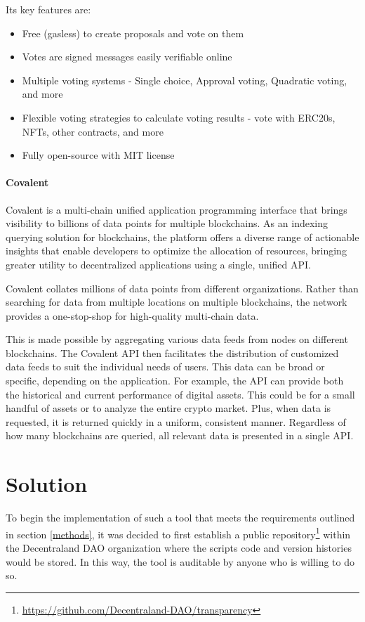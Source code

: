 \documentclass[MSE,Master,english]{twbook}%
\begin{document}
Its key features are:
\begin{itemize}
  \item Free (gasless) to create proposals and vote on them
  \item Votes are signed messages easily verifiable online
  \item Multiple voting systems - Single choice, Approval voting, Quadratic voting, and more
  \item Flexible voting strategies to calculate voting results - vote with ERC20s, NFTs, other contracts, and more
  \item Fully open-source with MIT license
\end{itemize}

\subsubsection{Covalent}
Covalent\cite{covalent} is a multi-chain unified application programming interface that brings visibility to billions of data points for multiple blockchains. As an indexing querying solution for blockchains, the platform offers a diverse range of actionable insights that enable developers to optimize the allocation of resources, bringing greater utility to decentralized applications using a single, unified API.

Covalent collates millions of data points from different organizations. Rather than searching for data from multiple locations on multiple blockchains, the network provides a one-stop-shop for high-quality multi-chain data.

This is made possible by aggregating various data feeds from nodes on different blockchains. The Covalent API then facilitates the distribution of customized data feeds to suit the individual needs of users. This data can be broad or specific, depending on the application. For example, the API can provide both the historical and current performance of digital assets. This could be for a small handful of assets or to analyze the entire crypto market. Plus, when data is requested, it is returned quickly in a uniform, consistent manner. Regardless of how many blockchains are queried, all relevant data is presented in a single API.

\chapter{Solution\label{solution}}
To begin the implementation of such a tool that meets the requirements outlined in section \ref{methods}, it was decided to first establish a public repository\footnote{\url{https://github.com/Decentraland-DAO/transparency}} within the Decentraland DAO organization where the scripts code and version histories would be stored. In this way, the tool is auditable by anyone who is willing to do so.
\end{document}
